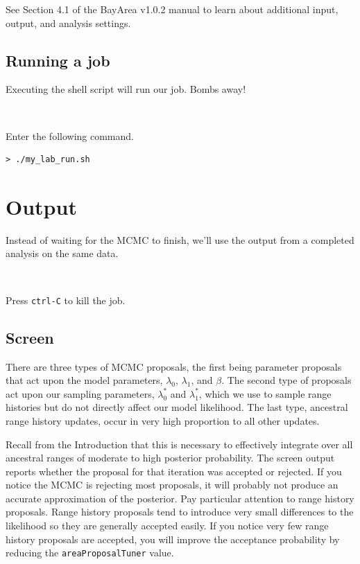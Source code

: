 \documentclass[11pt]{article}
\newcommand{\impmark}{\strut\vadjust{\domark}}
\newcommand{\domark}{%
  \vbox to 0pt{
    \kern-\dp\strutbox
    \smash{\llap{$\rightarrow$\kern1em}}
    \vss
  }%
}
\begin{document}
See Section 4.1 of the BayArea v1.0.2 manual to learn about additional input, output, and analysis settings.

\subsection{Running a job}

Executing the shell script will run our job. Bombs away!

\noindent \\ \impmark Enter the following command.
\begin{framed}
\begin{lstlisting}
> ./my_lab_run.sh
\end{lstlisting}
\end{framed}

\section{Output}

Instead of waiting for the MCMC to finish, we'll use the output from a completed analysis on the same data.

\noindent \\ \impmark Press \texttt{ctrl-C} to kill the job.

\subsection{Screen}

There are three types of MCMC proposals, the first being parameter proposals that act upon the model parameters, $\lambda_0$, $\lambda_1$, and $\beta$.
The second type of proposals act upon our sampling parameters, $\lambda^*_0$ and $\lambda^*_1$, which we use to sample range histories but do not directly affect our model likelihood.
The last type, ancestral range history updates, occur in very high proportion to all other updates.

Recall from the Introduction that this is necessary to effectively integrate over all ancestral ranges of moderate to high posterior probability.
The screen output reports whether the proposal for that iteration was accepted or rejected.
If you notice the MCMC is rejecting most proposals, it will probably not produce an accurate approximation of the posterior.
Pay particular attention to range history proposals.
Range history proposals tend to introduce very small differences to the likelihood so they are generally accepted easily.
If you notice very few range history proposals are accepted, you will improve the acceptance probability by reducing the \texttt{areaProposalTuner} value.
\end{document}
